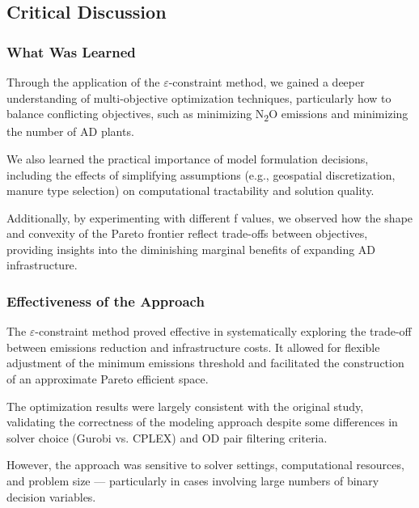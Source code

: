 \documentclass[12pt]{article}
\begin{document}
\subsection{Critical Discussion}

\subsubsection{What Was Learned}

Through the application of the $\varepsilon$-constraint method, we gained a deeper understanding of multi-objective optimization techniques, particularly how to balance conflicting objectives, such as minimizing N\textsubscript{2}O emissions and minimizing the number of AD plants.

We also learned the practical importance of model formulation decisions, including the effects of simplifying assumptions (e.g., geospatial discretization, manure type selection) on computational tractability and solution quality.

Additionally, by experimenting with different f values, we observed how the shape and convexity of the Pareto frontier reflect trade-offs between objectives, providing insights into the diminishing marginal benefits of expanding AD infrastructure.

\subsubsection{Effectiveness of the Approach}
The $\varepsilon$-constraint method proved effective in systematically exploring the trade-off between emissions reduction and infrastructure costs. It allowed for flexible adjustment of the minimum emissions threshold and facilitated the construction of an approximate Pareto efficient space.

The optimization results were largely consistent with the original study, validating the correctness of the modeling approach despite some differences in solver choice (Gurobi vs. CPLEX) and OD pair filtering criteria.

However, the approach was sensitive to solver settings, computational resources, and problem size — particularly in cases involving large numbers of binary decision variables.
\end{document}
